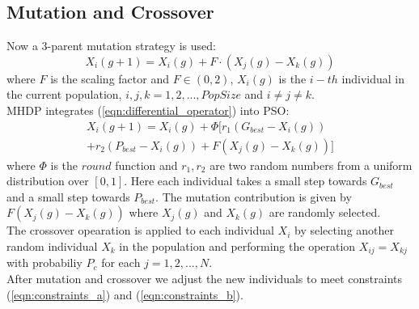 \subsection{Mutation and Crossover}
Now a 3-parent mutation strategy is used:
\begin{equation}
    \label{eqn:differential_operator}
    X_i(g+1) = X_i(g) + F \cdot (X_j(g) - X_k(g))
\end{equation}
where \(F\) is the scaling factor and \(F \in (0, 2)\), \(X_i(g)\) is the $i-th$ individual in the current population, $i, j, k = 1, 2, ..., PopSize$ and $i \neq j \neq k$.\\
MHDP integrates (\ref{eqn:differential_operator}) into PSO:
\begin{equation}
    \begin{aligned}
    \label{eqn:pso}
    X_i(g+1) = X_i(g) + \Phi[r_1(G_{best} - X_i(g)) \\
    + r_2(P_{best} - X_i(g)) + F(X_j(g) - X_k(g))]
    \end{aligned}
\end{equation}
where $\Phi$ is the $round$ function and $r_1, r_2$ are two random numbers
from a uniform distribution over $[0, 1]$. Here each individual takes a small
step towards $G_{best}$ and a small step towards $P_{best}$. The mutation contribution
is given by  $F(X_j(g) - X_k(g))$ where $X_j(g)$ and $X_k(g)$ are randomly selected.\\
The crossover opearation is applied to each individual $X_i$ by selecting another random 
individual $X_k$ in the population and performing the operation $X_{ij} = X_{kj}$ with probabiliy $P_c$ for each $j = 1, 2, ..., N$.\\
After mutation and crossover we adjust the new individuals to meet constraints (\ref{eqn:constraints_a}) and (\ref{eqn:constraints_b}).
